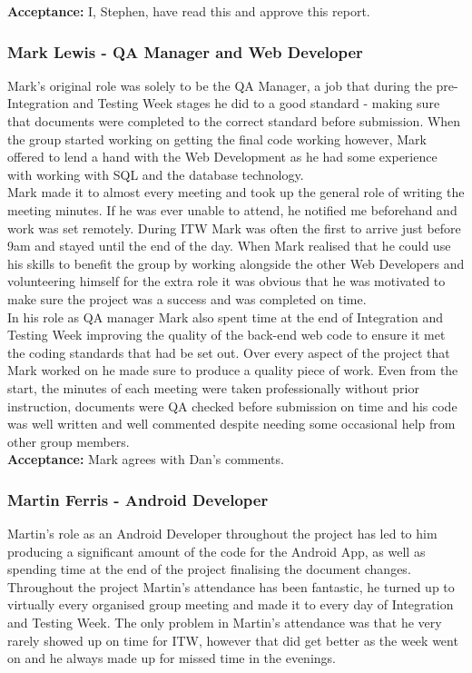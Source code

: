 \documentclass{article}
\begin{document}
	{\bf Acceptance:} I, Stephen, have read this and approve this report.


		\subsubsection{Mark Lewis - QA Manager and Web Developer}
		Mark's original role was solely to be the QA Manager, a job that during the pre-Integration and Testing Week stages he did to a good standard - making sure that documents were completed to the correct standard before submission. When the group started working on getting the final code working however, Mark offered to lend a hand with the Web Development as he had some experience with working with SQL and the database technology. \\
		
		Mark made it to almost every meeting and took up the general role of writing the meeting minutes. If he was ever unable to attend, he notified me beforehand and work was set remotely. During ITW Mark was often the first to arrive just before 9am and stayed until the end of the day. When Mark realised that he could use his skills to benefit the group by working alongside the other Web Developers and volunteering himself for the extra role it was obvious that he was motivated to make sure the project was a success and was completed on time. \\
		
		In his role as QA manager Mark also spent time at the end of Integration and Testing Week improving the quality of the back-end web code to ensure it met the coding standards that had be set out. Over every aspect of the project that Mark worked on he made sure to produce a quality piece of work. Even from the start, the minutes of each meeting were taken professionally without prior instruction, documents were QA checked before submission on time and his code was well written and well commented despite needing some occasional help from other group members. \\
		
{\bf Acceptance:} Mark agrees with Dan's comments. 


		\subsubsection{Martin Ferris - Android Developer}
		Martin's role as an Android Developer throughout the project has led to him producing a significant amount of the code for the Android App, as well as spending time at the end of the project finalising the document changes. Throughout the project Martin's attendance has been fantastic, he turned up to virtually every organised group meeting and made it to every day of Integration and Testing Week. The only problem in Martin's attendance was that he very rarely showed up on time for ITW, however that did get better as the week went on and he always made up for missed time in the evenings. \\
		
\end{document}
